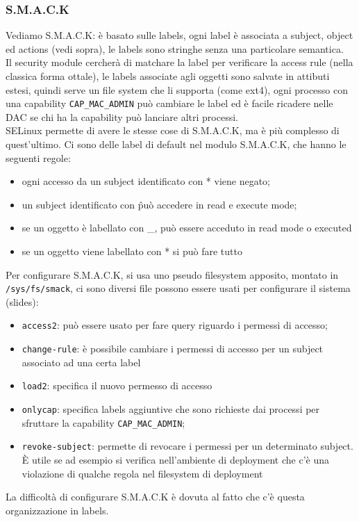 \documentclass[12pt, oneside]{extbook} %
\begin{document}
\subsubsection{S.M.A.C.K}
Vediamo S.M.A.C.K: è basato sulle labels, ogni label è associata a subject, object ed actions (vedi sopra), le labels sono stringhe senza una particolare semantica.\\Il security module cercherà di matchare la label per verificare la access rule (nella classica forma ottale), le labels associate agli oggetti sono salvate in attibuti estesi, quindi serve un file system che li supporta (come ext4), ogni processo con una capability \texttt{CAP\_MAC\_ADMIN} può cambiare le label ed è facile ricadere nelle DAC se chi ha la capability può lanciare altri processi.\\SELinux permette di avere le stesse cose di S.M.A.C.K, ma è più complesso di quest'ultimo. Ci sono delle label di default nel modulo S.M.A.C.K, che hanno le seguenti regole:
\begin{itemize}
\item ogni accesso da un subject identificato con * viene negato;
\item un subject identificato con \^ può accedere in read e execute mode;
\item se un oggetto è labellato con \_, può essere acceduto in read mode o executed
\item se un oggetto viene labellato con * si può fare tutto
\end{itemize}
Per configurare S.M.A.C.K, si usa uno pseudo filesystem apposito, montato in \texttt{/sys/fs/smack}, ci sono diversi file  possono essere usati per configurare il sistema (slides):
\begin{itemize}
\item \texttt{access2}: può essere usato per fare query riguardo i permessi di accesso;
\item \texttt{change-rule}: è possibile cambiare i permessi di accesso per un subject associato ad una certa label
\item \texttt{load2}: specifica il nuovo permesso di accesso
\item \texttt{onlycap}: specifica labels aggiuntive che sono richieste dai processi per sfruttare la capability \texttt{CAP\_MAC\_ADMIN};
\item \texttt{revoke-subject}: permette di revocare i permessi per un determinato subject. È utile se ad esempio si verifica nell'ambiente di deployment che c'è una violazione di qualche regola nel filesystem di deployment
\end{itemize}
La difficoltà di configurare S.M.A.C.K è dovuta al fatto che c'è questa organizzazione in labels.
\end{document}

